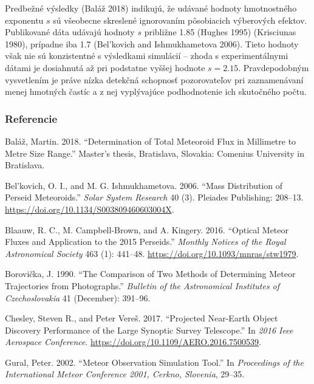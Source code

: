 Predbežné výsledky (Baláž 2018) indikujú, že udávané hodnoty
hmotnostného exponentu \(s\) sú všeobecne skreslené ignorovaním
pôsobiacich výberových efektov. Publikované dáta udávajú hodnoty \(s\)
približne \num{1.85} (Hughes 1995) (Krisciunas 1980), prípadne iba
\num{1.7} (Bel'kovich and Ishmukhametova 2006). Tieto hodnoty však nie
sú konzistentné s výsledkami simulácií -- zhoda s experimentálnymi
dátami je dosiahnutá až pri podstatne vyššej hodnote \(s = \num{2.15}\).
Pravdepodobným vysvetlením je práve nízka detekčná schopnosť
pozorovateľov pri zaznamenávaní menej hmotných častíc a z nej
vyplývajúce podhodnotenie ich skutočného počtu.

\subsubsection*{Referencie}\label{referencie}

\hypertarget{refs}{}
\hypertarget{ref-balaz2018}{}
Baláž, Martin. 2018. ``Determination of Total Meteoroid Flux in
Millimetre to Metre Size Range.'' Master's thesis, Bratislava, Slovakia:
Comenius University in Bratislava.

\hypertarget{ref-belkovich2006}{}
Bel'kovich, O. I., and M. G. Ishmukhametova. 2006. ``Mass Distribution
of Perseid Meteoroids.'' \emph{Solar System Research} 40 (3). Pleiades
Publishing: 208--13. \url{https://doi.org/10.1134/S003809460603004X}.

\hypertarget{ref-blaauw2016}{}
Blaauw, R. C., M. Campbell-Brown, and A. Kingery. 2016. ``Optical Meteor
Fluxes and Application to the 2015 Perseids.'' \emph{Monthly Notices of
the Royal Astronomical Society} 463 (1): 441--48.
\url{https://doi.org/10.1093/mnras/stw1979}.

\hypertarget{ref-borovicka1990}{}
Borovička, J. 1990. ``The Comparison of Two Methods of Determining
Meteor Trajectories from Photographs.'' \emph{Bulletin of the
Astronomical Institutes of Czechoslovakia} 41 (December): 391--96.

\hypertarget{ref-chesley2017}{}
Chesley, Steven R., and Peter Vereš. 2017. ``Projected Near-Earth Object
Discovery Performance of the Large Synoptic Survey Telescope.'' In
\emph{2016 Ieee Aerospace Conference}.
\url{https://doi.org/10.1109/AERO.2016.7500539}.

\hypertarget{ref-gural2002}{}
Gural, Peter. 2002. ``Meteor Observation Simulation Tool.'' In
\emph{Proceedings of the International Meteor Conference 2001, Cerkno,
Slovenia}, 29--35.

